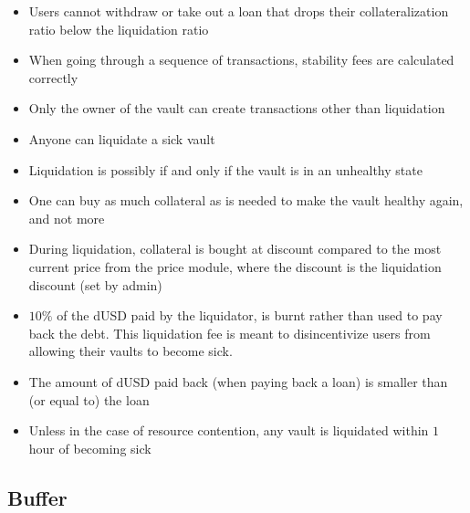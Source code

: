 \documentclass{article} %
\begin{document}
\begin{itemize}
  \item Users cannot withdraw or take out a loan that drops their
    collateralization ratio below the liquidation ratio
  \item When going through a sequence of transactions, stability fees are
    calculated correctly
  \item Only the owner of the vault can create transactions other than
    liquidation
  \item Anyone can liquidate a sick vault
  \item Liquidation is possibly if and only if the vault is in an unhealthy
    state
  \item One can buy as much collateral as is needed to make the vault healthy
    again, and not more
  \item During liquidation, collateral is bought at discount compared to the
    most current price from the price module, where the discount is the
    liquidation discount (set by admin)
  \item $10\%$ of the dUSD paid by the liquidator, is burnt rather than used to
    pay back the debt. This liquidation fee is meant to disincentivize users
    from allowing their vaults to become sick.
  \item The amount of dUSD paid back (when paying back a loan) is smaller than
    (or equal to) the loan
  \item Unless in the case of resource contention, any vault is liquidated
    within $1$ hour of becoming sick
\end{itemize}

\subsection{Buffer}
\end{document}
